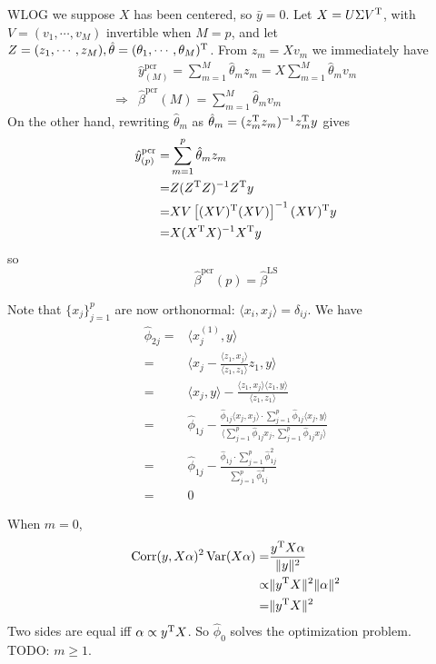\begin{sol}
WLOG we suppose $X$ has been centered, so $\bar{y}=0$. Let $X=U\Sigma V^{\mathrm{T}}$, with $V=(v_1,\cdots,v_M)$ invertible when $M=p$, and let $Z=(z_1,\cdots,z_M), \hat{\theta}=(\theta_1,\cdots,\theta_M)^{\mathrm{T}}$. From $z_m=Xv_m$ we immediately have
\begin{align*}
&\hat{y}_{(M)}^\mathrm{pcr}=\sum_{m=1}^{M}\hat{\theta}_mz_m=X\sum_{m=1}^{M}\hat{\theta}_mv_m\\
\Longrightarrow & \hat{\beta}^\mathrm{pcr}(M)=\sum_{m=1}^{M}\hat{\theta}_mv_m
\end{align*}
On the other hand, rewriting $\hat{\theta}_m$ as $\hat{\theta}_m=(z_m^{\mathrm{T}}z_m)^{-1}z_m^{\mathrm{T}}y$ gives 
\begin{align*}
\hat{y}_{(p)}^\mathrm{pcr}=&\sum_{m=1}^{p}\hat{\theta}_mz_m\\
=& Z(Z^{\mathrm{T}}Z)^{-1}Z^{\mathrm{T}}y\\
=& XV\left[(XV)^{\mathrm{T}}(XV)\right]^{-1}(XV)^{\mathrm{T}}y\\
=& X(X^{\mathrm{T}}X)^{-1}X^{\mathrm{T}}y
\end{align*}
so
\[
\hat{\beta}^\mathrm{pcr}(p)=\hat{\beta}^\mathrm{LS}
\]
\end{sol}

\begin{sol}
Note that $\{x_j\}_{j=1}^p$ are now orthonormal: $\langle x_i, x_j\rangle=\delta_{ij}$. We have
\begin{align*}
\hat{\phi}_{2j} =& \langle x_j^{(1)}, y\rangle\\
=& \langle x_j-\frac{\langle z_1, x_j \rangle}{\langle z_1, z_1 \rangle} z_1,y \rangle\\
=& \langle x_j,y\rangle - \frac{\langle z_1, x_j \rangle\langle z_1, y \rangle}{\langle z_1, z_1 \rangle}\\
=& \hat{\phi}_{1j}-\frac{\hat{\phi}_{1j}\langle x_j,x_j \rangle\cdot\sum_{j=1}^p\hat{\phi}_{1j}\langle x_j,y\rangle}{\langle \sum_{j=1}^p\hat{\phi}_{1j}x_j,\sum_{j=1}^p\hat{\phi}_{1j}x_j\rangle}\\
=& \hat{\phi}_{1j}-\frac{\hat{\phi}_{1j}\cdot\sum_{j=1}^p\hat{\phi}_{1j}^2}{ \sum_{j=1}^p\hat{\phi}_{1j}^2}\\
=& 0
\end{align*}
\end{sol}

\begin{sol}
When $m=0$,
\begin{align*}
\operatorname{Corr}(y,X\alpha)^2\operatorname{Var}(X\alpha)=& \frac{y^{\mathrm{T}}X\alpha}{\|y\|^2}\\
\propto & \|y^{\mathrm{T}}X\|^2\|\alpha\|^2\\
=& \|y^{\mathrm{T}}X\|^2
\end{align*}
Two sides are equal iff $\alpha\propto y^{\mathrm{T}}X$. So $\hat{\phi}_0$ solves the optimization problem. \\
TODO: $m\ge 1$.
\end{sol}